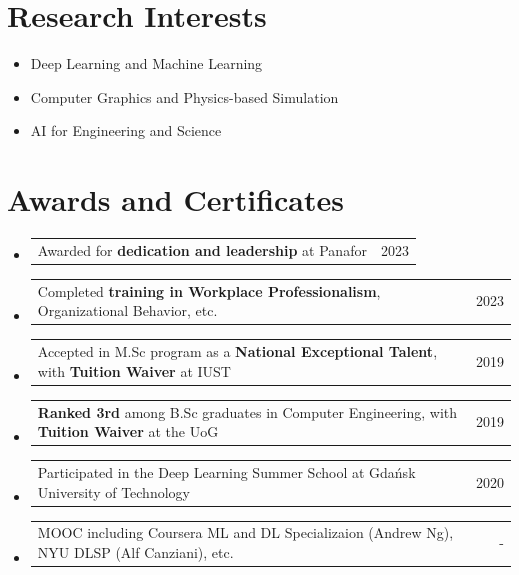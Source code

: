 \documentclass[letterpaper,11pt]{article}
\makeatletter
\newcommand{\resumeItem}[1]{
  \item\small{
    {#1 \vspace{0pt}}
  }
}
\newcommand{\awarditem}[2]{
  \item
    \begin{tabular*}{0.97\textwidth}{l@{\extracolsep{\fill}}r}
      #1 & #2 \\ 
    \end{tabular*}\vspace{-5pt}
}
\newcommand{\resumeSubHeadingListStart}{\begin{itemize}[leftmargin=*]}
\newcommand{\resumeSubHeadingListEnd}{\end{itemize}}
\newcommand{\awarditemListStart}{\begin{itemize}[leftmargin=*]}
\newcommand{\awarditemListEnd}{\end{itemize}\vspace{-5pt}}
\makeatother
\begin{document}

\section{Research Interests}
  \resumeSubHeadingListStart
    \resumeItem{Deep Learning and Machine Learning}
    \vspace{-5pt}
    \resumeItem{Computer Graphics and Physics-based Simulation} 
    \vspace{-5pt}
    \resumeItem{AI for Engineering and Science}
  \resumeSubHeadingListEnd

\section{Awards and Certificates}
\awarditemListStart
  \awarditem{Awarded for \textbf{dedication and leadership} at Panafor}{2023}
  \awarditem{Completed \textbf{training in Workplace Professionalism}, Organizational Behavior, etc.}{2023}
  \awarditem{Accepted in M.Sc program as a \textbf{National Exceptional Talent}, with \textbf{Tuition Waiver} at IUST}{2019}
  \awarditem{\textbf{Ranked 3rd} among B.Sc graduates in Computer Engineering, with \textbf{Tuition Waiver} at the UoG}{2019}
  \awarditem{Participated in the Deep Learning Summer School at Gda\'{n}sk University of Technology}{2020}
  \awarditem{MOOC including Coursera ML and DL Specializaion (Andrew Ng), NYU DLSP (Alf Canziani), etc.}{-}

\awarditemListEnd

\end{document}
